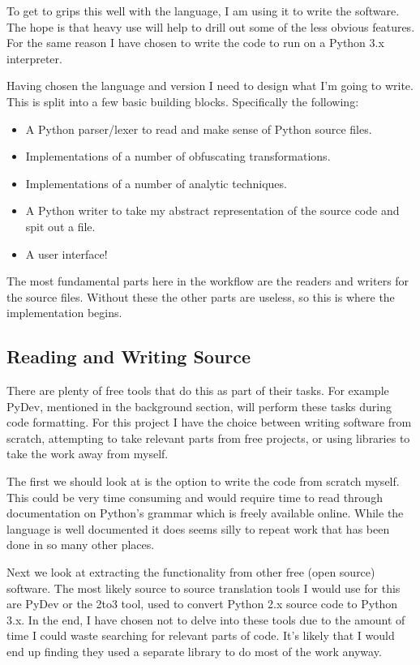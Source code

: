 \documentclass{report}
\begin{document}
To get to grips this well with the language, I am using it to write the software. The hope is that heavy use will help to
drill out some of the less obvious features. For the same reason I have chosen to write the code to run on a Python 3.x
interpreter.

Having chosen the language and version I need to design what I'm going to write. This is split into a few basic building
blocks. Specifically the following:

\begin{itemize}
\item A Python parser/lexer to read and make sense of Python source files.
\item Implementations of a number of obfuscating transformations.
\item Implementations of a number of analytic techniques.
\item A Python writer to take my abstract representation of the source code and spit out a file.
\item A user interface!
\end{itemize}

The most fundamental parts here in the workflow are the readers and writers for the source files.
Without these the other parts are useless, so this is where the implementation begins.

\subsection{Reading and Writing Source}

There are plenty of free tools that do this as part of their tasks. For example PyDev, mentioned in the background section, will
perform these tasks during code formatting. For this project I have the choice between writing software from scratch, attempting
to take relevant parts from free projects, or using libraries to take the work away from myself.

The first we should look at is the option to write the code from scratch myself. This could be very time consuming and would require time
to read through documentation on Python's grammar which is freely available online\cite{pygrammar}. While the language is well
documented it does seems silly to repeat work that has been done in so many other places.

Next we look at extracting the functionality from other free (open source) software. The most likely source to source translation tools
I would use for this are PyDev or the 2to3 tool\cite{2to3}, used to convert Python 2.x source code to Python 3.x. In the end, I have
chosen not to delve into these tools due to the amount of time I could waste searching for relevant parts of code. It's likely that I
would end up finding they used a separate library to do most of the work anyway.
\end{document}
